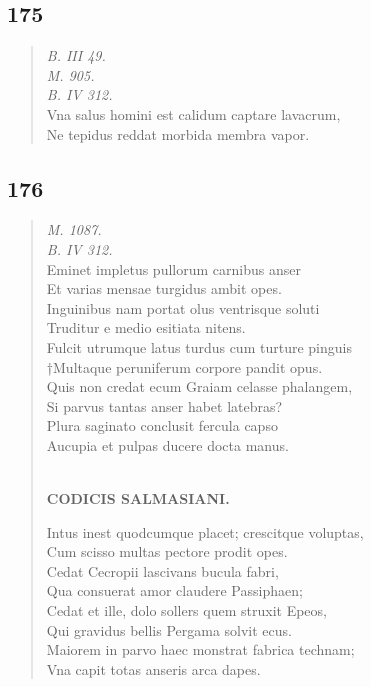 \documentclass[11pt, a4paper]{report}
\begin{document}
            \subsection*{175}
      \begin{verse}
      \textit{B. III 49.} \\ \textit{M. 905.} \\ \textit{B. IV 312.} \\ Vna salus homini est calidum captare lavacrum, \\ Ne tepidus reddat morbida membra vapor. \\ 
      \end{verse}
  
            \subsection*{176}
      \begin{verse}
      \textit{M. 1087.} \\ \textit{B. IV 312.} \\ Eminet impletus pullorum carnibus anser \\ Et varias mensae turgidus ambit opes. \\ Inguinibus nam portat olus ventrisque soluti \\ Truditur e medio esitiata nitens. \\ Fulcit utrumque latus turdus cum turture pinguis \\ †Multaque peruniferum corpore pandit opus. \\ Quis non credat ecum Graiam celasse phalangem, \\ Si parvus tantas anser habet latebras? \\ Plura saginato conclusit fercula capso \\ Aucupia et pulpas ducere docta manus. \\ 
        ﻿\pagebreak 
    \begin{center} \textbf{CODICIS SALMASIANI.} \end{center} \marginpar{[153]} Intus inest quodcumque placet; crescitque voluptas, \\ Cum scisso multas pectore prodit opes. \\ Cedat Cecropii lascivans bucula fabri, \\ Qua consuerat amor claudere Passiphaen; \\ Cedat et ille, dolo sollers quem struxit Epeos, \\ Qui gravidus bellis Pergama solvit ecus. \\ Maiorem in parvo haec monstrat fabrica technam; \\ Vna capit totas anseris arca dapes. \\ 
      \end{verse}
  
\end{document}
